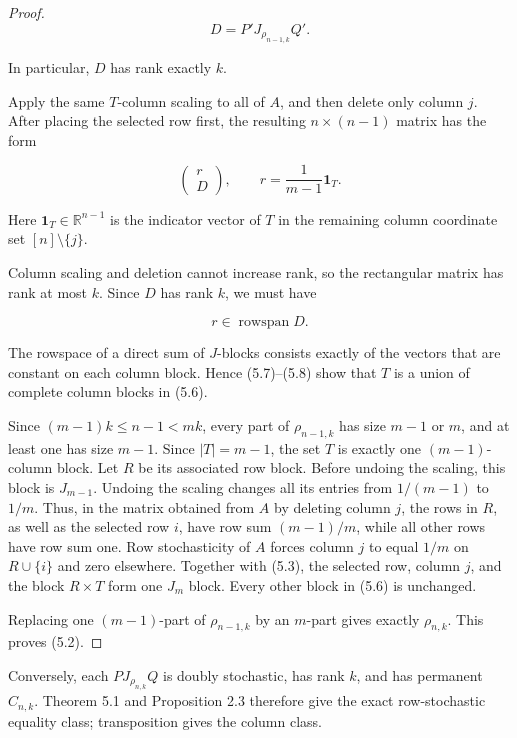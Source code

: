 \documentclass[11pt]{article}
\theoremstyle{remark}
\begin{document}
\begin{proof}
\[
 D=P'J_{\rho_{n-1,k}}Q'.                                   \tag{5.6}
\]

In particular, \(D\) has rank exactly \(k\).

Apply the same \(T\)-column scaling to all of \(A\), and then delete only
column \(j\). After placing the selected row first, the resulting
\(n\times(n-1)\) matrix has the form

\[
 \begin{pmatrix}r\\D\end{pmatrix},
 \qquad
 r=\frac1{m-1}\mathbf1_T.                                  \tag{5.7}
\]

Here \(\mathbf1_T\in\mathbb R^{n-1}\) is the indicator vector of \(T\) in
the remaining column coordinate set \([n]\setminus\{j\}\).

Column scaling and deletion cannot increase rank, so the rectangular matrix
has rank at most \(k\). Since \(D\) has rank \(k\), we must have

\[
 r\in\operatorname{rowspan}D.                              \tag{5.8}
\]

The rowspace of a direct sum of \(J\)-blocks consists exactly of the vectors
that are constant on each column block. Hence (5.7)--(5.8) show that \(T\)
is a union of complete column blocks in (5.6).

Since \((m-1)k\leq n-1<mk\), every part of \(\rho_{n-1,k}\) has size
\(m-1\) or \(m\), and at least one has size \(m-1\). Since \(|T|=m-1\),
the set \(T\) is exactly one \((m-1)\)-column block. Let \(R\) be its
associated row block.
Before undoing the scaling, this block is \(J_{m-1}\). Undoing the scaling
changes all its entries from \(1/(m-1)\) to \(1/m\). Thus, in the matrix
obtained from \(A\) by deleting column \(j\), the rows in \(R\), as well as
the selected row \(i\), have row sum \((m-1)/m\), while all other rows have
row sum one. Row stochasticity of \(A\) forces column \(j\) to equal \(1/m\)
on \(R\cup\{i\}\) and zero elsewhere. Together with (5.3), the selected
row, column \(j\), and the block
\(R\times T\) form one \(J_m\) block. Every other block in (5.6) is
unchanged.

Replacing one \((m-1)\)-part of \(\rho_{n-1,k}\) by an \(m\)-part gives
exactly \(\rho_{n,k}\). This proves (5.2).
\end{proof}

Conversely, each \(PJ_{\rho_{n,k}}Q\) is doubly stochastic, has rank \(k\),
and has permanent \(C_{n,k}\). Theorem 5.1 and Proposition 2.3 therefore
give the exact row-stochastic equality class; transposition gives the column
class.
\end{document}
